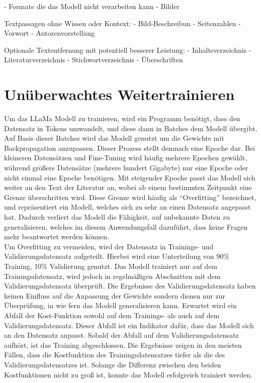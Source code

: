 - Formate die das Modell nicht verarbeiten kann
    - Bilder

Textpassagen ohne Wissen oder Kontext:
    - Bild-Beschreibun
    - Seitenzahlen
    - Vorwort
    - Autorenvorstellung

Optionale Textentfernung mit potentiell besserer Leistung:
    - Inhaltsverzeichnis
    - Literaturverzeichnis
    - Stichwortverzeichnis
    - Überschriften

\section{Unüberwachtes Weitertrainieren}
Um das LLaMa Modell zu trainieren, wird ein Programm benötigt, dass den Datensatz in Tokens umwandelt, und diese dann in Batches dem Modell übergibt.
Auf Basis dieser Batches wird das Modell genutzt um die Gewichte mit Backpropagation anzupassen.
Dieser Prozess stellt demnach eine Epoche dar.
Bei kleineren Datensätzen und Fine-Tuning wird häufig mehrere Epochen gewählt, während größere Datensätze (mehrere hundert Gigabyte) nur eine Epoche oder nicht einmal eine Epoche benötigen.
Mit steigender Epoche passt das Modell sich weiter an den Text der Literatur an, wobei ab einem bestimmten Zeitpunkt eine Grenze überschritten wird.
Diese Grenze wird häufig als \enquote{Overfitting} bezeichnet, und repräsentiert ein Modell, welches sich zu sehr an einen Datensatz angepasst hat.
Dadurch verliert das Modell die Fähigkeit, auf unbekannte Daten zu generalisieren, welches im diesem Anwendungsfall dazuführt, dass keine Fragen mehr beantwortet werden können.\\

Um Overfitting zu vermeiden, wird der Datensatz in Trainings- und Validierungsdatensatz aufgeteilt.
Hierbei wird eine Unterteilung von 90\% Training, 10\% Validierung genutzt.
Das Modell trainiert nur auf dem Trainingsdatensatz, wird jedoch in regelmäßigen Abschnitten mit dem Validierungsdatensatz überprüft.
Die Ergebnisse des Validierungsdatensatz haben keinen Einfluss auf die Anpassung der Gewichte sondern dienen nur zur Überprüfung, in wie fern das Modell generalisieren kann.
Erwartet wird ein Abfall der Kost-Funktion sowohl auf dem Trainings- als auch auf dem Validierungsdatensatz.
Dieser Abfall ist ein Indikator dafür, dass das Modell sich an den Datensatz anpasst.
Sobald der Abfall auf dem Validierungsdatensatz aufhört, ist das Training abgeschlossen.
Die Ergebnisse zeigen in den meisten Fällen, dass die Kostfunktion des Trainingsdatensatzes tiefer als die des Validierungsdatensatzes ist.
Solange die Differenz zwischen den beiden Kostfunktionen nicht zu groß ist, konnte das Modell erfolgreich trainiert werden.\\


